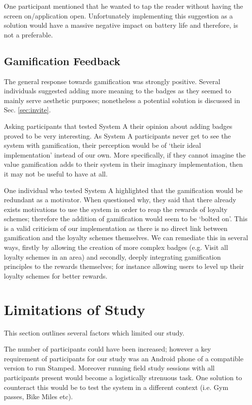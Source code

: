 One participant mentioned that he wanted to tap the reader without having the screen on/application open. Unfortunately implementing this suggestion as a solution would have a massive negative impact on battery life and therefore, is not a preferable.
\subsection{Gamification Feedback}
The general response towards gamification was strongly positive. Several individuals suggested adding more meaning to the badges as they seemed to mainly serve aesthetic purposes; nonetheless   a potential solution is discussed in Sec. \ref{sec:invite}.

Asking participants that tested System A their opinion about adding badges proved to be very interesting. As System A participants never get to see the system with gamification, their perception would be of `their ideal implementation' instead of our own. More specifically, if they cannot imagine the value gamification adds to their system in their imaginary implementation, then it may not be useful to have at all.

One individual who tested System A highlighted that the gamification would be redundant as a motivator. When questioned why, they said that there already exists motivations to use the system in order to reap the rewards of loyalty schemes; therefore the addition of gamification would seem to be `bolted on'. This is a valid criticism of our implementation as there is no direct link between gamification and the loyalty schemes themselves. We can remediate this in several ways, firstly by allowing the creation of more complex badges (e.g. Visit all loyalty schemes in an area) and secondly, deeply integrating gamification principles to the rewards themselves; for instance allowing users to level up their loyalty schemes for better rewards.

\section{Limitations of Study}
This section outlines several factors which limited our study.

The number of participants could have been increased; however a key requirement of participants for our study was an Android phone of a compatible version to run Stamped. Moreover running field study sessions with all participants present would become a logistically strenuous task. One solution to counteract this would be to test the system in a different context (i.e. Gym passes, Bike Miles etc).

